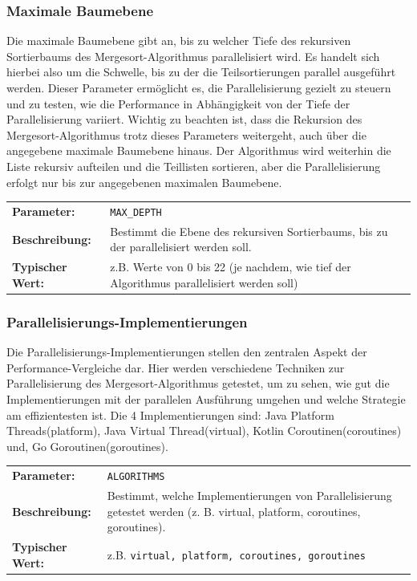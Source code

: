 \documentclass[fontsize=12pt,paper=a4,twoside=semi,parskip=half-,headsepline,headinclude]{scrreprt}
\begin{document}
\subsubsection{Maximale Baumebene}

Die maximale Baumebene gibt an, bis zu welcher Tiefe des rekursiven Sortierbaums des Mergesort-Algorithmus parallelisiert wird. Es handelt sich hierbei also um die Schwelle, bis zu der die Teilsortierungen parallel ausgeführt werden. Dieser Parameter ermöglicht es, die Parallelisierung gezielt zu steuern und zu testen, wie die Performance in Abhängigkeit von der Tiefe der Parallelisierung variiert. Wichtig zu beachten ist, dass die Rekursion des Mergesort-Algorithmus trotz dieses Parameters weitergeht, auch über die angegebene maximale Baumebene hinaus. Der Algorithmus wird weiterhin die Liste rekursiv aufteilen und die Teillisten sortieren, aber die Parallelisierung erfolgt nur bis zur angegebenen maximalen Baumebene.

\begin{tabularx}{\textwidth}{@{}lX@{}}
	\textbf{Parameter:}    & \texttt{MAX\_DEPTH} \\
	\textbf{Beschreibung:} & Bestimmt die Ebene des rekursiven Sortierbaums, 
	bis zu der parallelisiert werden soll. \\
	\textbf{Typischer Wert:} & z.B. Werte von 0 bis 22 (je nachdem, wie tief der Algorithmus parallelisiert werden soll)
\end{tabularx}

\subsubsection{Parallelisierungs-Implementierungen}

Die Parallelisierungs-Implementierungen stellen den zentralen Aspekt der Performance-Vergleiche dar. Hier werden verschiedene Techniken zur Parallelisierung des Mergesort-Algorithmus getestet, um zu sehen, wie gut die Implementierungen mit der parallelen Ausführung umgehen und welche Strategie am effizientesten ist. Die 4 Implementierungen sind: Java Platform Threads(platform), Java Virtual Thread(virtual), Kotlin Coroutinen(coroutines) und, Go Goroutinen(goroutines).

\begin{tabularx}{\textwidth}{@{}lX@{}}
	\textbf{Parameter:}    & \texttt{ALGORITHMS} \\
	\textbf{Beschreibung:} & Bestimmt, welche Implementierungen von Parallelisierung getestet werden (z. B. virtual, platform, coroutines, goroutines). \\
	\textbf{Typischer Wert:} & z.B. \texttt{virtual, platform, coroutines, goroutines}
\end{tabularx}
\end{document}
